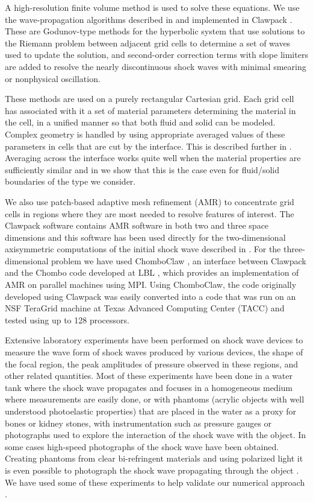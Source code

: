 \documentclass{article}
\begin{document}
A high-resolution finite volume method is used to solve these equations.
We use the wave-propagation algorithms described in \cite{rjl_book}
and implemented in Clawpack \cite{clawpack}.  These are Godunov-type
methods for the hyperbolic system that use solutions to the Riemann problem
between adjacent grid cells to determine a set of waves used to update the
solution, and second-order correction terms with slope limiters are added to
resolve the nearly discontinuous shock waves with minimal smearing or
nonphysical oscillation.

These methods are used on a purely rectangular Cartesian grid.  Each
grid cell has associated with it a set of material parameters
determining the material in the cell, in a unified manner so that
both fluid and solid can be modeled.   Complex geometry is handled
by using appropriate averaged values of these parameters in cells
that are cut by the interface.  This is described further in .
Averaging across the interface works quite well when the material properties
are sufficiently similar and in  we show that this is the case even
for fluid/solid boundaries of the type we consider.  

We also use patch-based adaptive mesh refinement (AMR) to concentrate
grid cells in regions where they are most needed to resolve features
of interest.  The Clawpack software contains AMR software in both
two and three space dimensions and this software has been used
directly for the two-dimensional axisymmetric computations of the
initial shock wave described in .  For the three-dimensional
problem we have used ChomboClaw \cite{chomboclaw}, an interface between
Clawpack and the Chombo code developed at LBL \cite{chombo}, which
provides an implementation of AMR on parallel machines using MPI.
Using ChomboClaw, the code originally developed using Clawpack was
easily converted into a code that was run on an NSF TeraGrid machine at
Texas Advanced Computing Center (TACC) and tested using up to 128 processors.


Extensive laboratory experiments have been performed on
shock wave devices to measure the wave form of shock waves produced by
various devices, the shape of the focal region, the peak amplitudes of
pressure observed in these regions, and other related quantities.  Most of
these experiments have been done in a water tank where the shock wave
propagates and focuses in a homogeneous medium where measurements are easily
done, or with phantoms (acrylic objects with well understood photoelastic properties)
 that are placed in the water as a proxy for bones or
kidney stones, with instrumentation such as pressure gauges or photographs
used to explore the interaction of the shock wave with the object.  In some
cases high-speed photographs of the shock wave have been obtained.
Creating phantoms from clear bi-refringent materials and using polarized
light it is even possible to photograph the shock wave propagating through
the object \cite{oleg_bailey}.  We have used some of these experiments to help
validate our numerical approach \cite{kfagnan_hyp06}.
\end{document}
